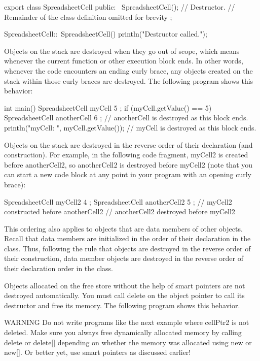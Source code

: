 \begin{cpp}
export class SpreadsheetCell
{
    public:
        ~SpreadsheetCell(); // Destructor.
        // Remainder of the class definition omitted for brevity
};

SpreadsheetCell::~SpreadsheetCell()
{
    println("Destructor called.");
}
\end{cpp}

Objects on the stack are destroyed when they go out of scope, which means whenever the current function or other execution block ends. In other words, whenever the code encounters an ending curly brace, any objects created on the stack within those curly braces are destroyed. The following program shows this behavior:

\begin{cpp}
int main()
{
    SpreadsheetCell myCell { 5 };
    if (myCell.getValue() == 5) {
        SpreadsheetCell anotherCell { 6 };
    } // anotherCell is destroyed as this block ends.
    println("myCell: {}", myCell.getValue());
} // myCell is destroyed as this block ends.
\end{cpp}

Objects on the stack are destroyed in the reverse order of their declaration (and construction). For example, in the following code fragment, myCell2 is created before anotherCell2, so anotherCell2 is destroyed before myCell2 (note that you can start a new code block at any point in your program with an opening curly brace):

\begin{cpp}
{
    SpreadsheetCell myCell2 { 4 };
    SpreadsheetCell anotherCell2 { 5 }; // myCell2 constructed before anotherCell2
} // anotherCell2 destroyed before myCell2
\end{cpp}

This ordering also applies to objects that are data members of other objects. Recall that data members are initialized in the order of their declaration in the class. Thus, following the rule that objects are destroyed in the reverse order of their construction, data member objects are destroyed in the reverse order of their declaration order in the class.

Objects allocated on the free store without the help of smart pointers are not destroyed automatically. You must call delete on the object pointer to call its destructor and free its memory. The following program shows this behavior.

\begin{myWarning}{WARNING}
Do not write programs like the next example where cellPtr2 is not deleted. Make sure you always free dynamically allocated memory by calling delete or delete[] depending on whether the memory was allocated using new or new[]. Or better yet, use smart pointers as discussed earlier!
\end{myWarning}

